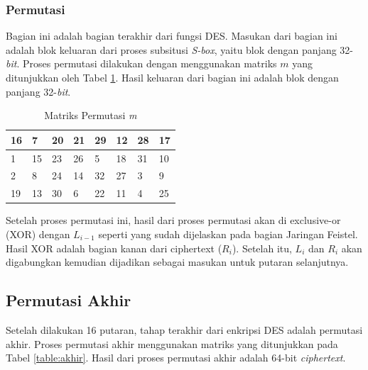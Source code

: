 \subsubsection{Permutasi}

Bagian ini adalah bagian terakhir dari fungsi DES. Masukan dari bagian ini adalah blok keluaran dari proses subsitusi \textit{S-box}, yaitu blok dengan panjang 32-\textit{bit}. Proses permutasi dilakukan dengan menggunakan matriks \begin{math}m\end{math} yang ditunjukkan oleh Tabel \ref{table:permutasi_langsung}. Hasil keluaran dari bagian ini adalah blok dengan panjang 32-\textit{bit}.

\begin{table}[H]
	\begin{center}
		\caption{Matriks Permutasi \textit{m}}\label{table:permutasi_langsung}
		\begin{tabular}{|l|l|l|l|l|l|l|l|}
				\hline
				16	&	7	&	20	&	21	&	29	&	12	&	28	&	17	\\ \hline
				1	&	15	&	23	&	26	&	5	&	18	&	31	&	10		\\ \hline
				2	&	8	&	24	&	14	&	32	&	27	&	3	&	9				\\ \hline
				19	&	13	&	30	&	6	&	22	&	11	&	4	&	25	\\ \hline
		\end{tabular}
	\end{center}
\end{table}

Setelah proses permutasi ini, hasil dari proses permutasi akan di exclusive-or (XOR) dengan \begin{math}L_{i-1}\end{math} seperti yang sudah dijelaskan pada bagian Jaringan Feistel. Hasil XOR adalah bagian kanan dari ciphertext (\begin{math}R_i\end{math}). Setelah itu, \begin{math}L_i\end{math} dan \begin{math}R_i\end{math} akan digabungkan kemudian dijadikan sebagai masukan untuk putaran selanjutnya.

\subsection{Permutasi Akhir}

Setelah dilakukan 16 putaran, tahap terakhir dari enkripsi DES adalah permutasi akhir. Proses permutasi akhir menggunakan matriks yang ditunjukkan pada Tabel \ref{table:akhir}. Hasil dari proses permutasi akhir adalah 64-bit \textit{ciphertext}.

